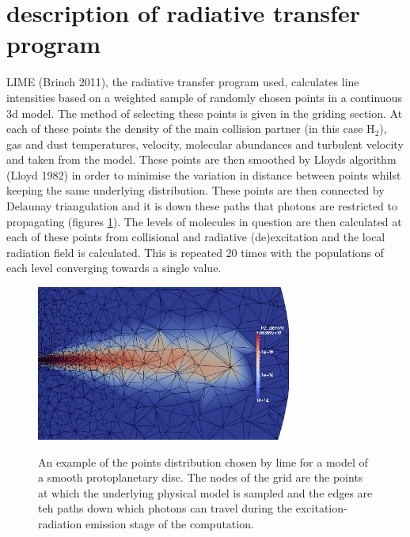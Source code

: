 \documentclass[useAMS,usenatbib]{mn2e}
\begin{document}
\section{description of radiative transfer program}
LIME (Brinch 2011), the radiative transfer program used, calculates line intensities based on a weighted sample of randomly chosen points in a continuous 3d model. The method of selecting these points is given in the griding section. At each of these points the density of the main collision partner (in this case H$_2$), gas and dust temperatures, velocity, molecular abundances and turbulent velocity and taken from the model. These points are then smoothed by Lloyds algorithm (Lloyd 1982) in order to minimise the variation in distance between points whilst keeping the same underlying distribution. These points are then connected by Delaunay triangulation and it is down these paths that photons are restricted to propagating (figures \ref{grid}). The levels of molecules in question are then  calculated at each of these points from collisional and radiative (de)excitation and the local radiation field is calculated. This is repeated 20 times with the populations of each level converging towards a single value.\newline


\begin{figure}
 \includegraphics[width=84mm]{Figures/model/Lime_grid3.png}
 \label{grid}
 \caption{An example of the points distribution chosen by lime for a model of a smooth protoplanetary disc. The nodes of the grid are the points at which the underlying physical model is sampled and the edges are teh paths down which photons can travel during the excitation-radiation emission stage of the computation.}
\end{figure}
\end{document}
